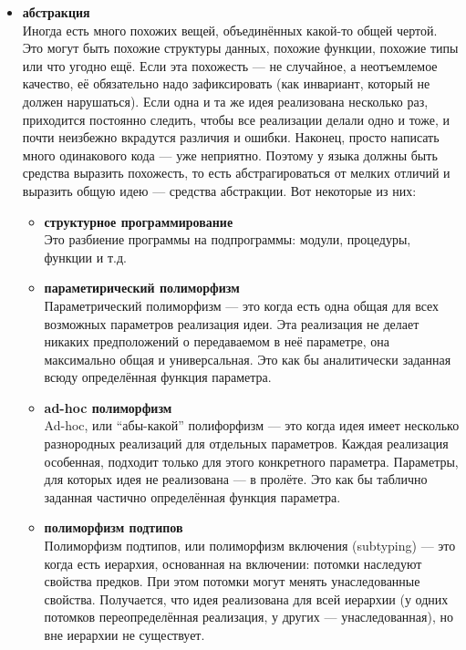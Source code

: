 \documentclass[11pt]{book}
\begin{document}
\begin{itemize}
\item \textbf{абстракция}
    \\
    Иногда есть много похожих вещей, объединённых какой-то общей чертой.
    Это могут быть похожие структуры данных, похожие функции, похожие типы или что угодно ещё.
    Если эта похожесть --- не случайное, а неотъемлемое качество, её обязательно надо зафиксировать
    (как инвариант, который не должен нарушаться).
    Если одна и та же идея реализована несколько раз, приходится постоянно следить, чтобы все реализации делали одно и тоже,
    и почти неизбежно вкрадутся различия и ошибки.
    Наконец, просто написать много одинакового кода --- уже неприятно.
    Поэтому у языка должны быть средства выразить похожесть,
    то есть абстрагироваться от мелких отличий и выразить общую идею --- средства абстракции.
    Вот некоторые из них:
    \begin{itemize}
    \item \textbf{структурное программирование}
        \\
        Это разбиение программы на подпрограммы: модули, процедуры, функции и т.д.

    \item \textbf{параметирический полиморфизм}
        \\
        Параметрический полиморфизм --- это когда есть одна общая для всех возможных параметров реализация идеи.
        Эта реализация не делает никаких предположений о передаваемом в неё параметре, она максимально общая и универсальная.
        Это как бы аналитически заданная всюду определённая функция параметра.

    \item \textbf{ad-hoc полиморфизм}
        \\
        Ad-hoc, или ``абы-какой'' полифорфизм --- это когда идея имеет несколько разнородных реализаций для отдельных параметров.
        Каждая реализация особенная, подходит только для этого конкретного параметра.
        Параметры, для которых идея не реализована --- в пролёте.
        Это как бы таблично заданная частично определённая функция параметра.

    \item \textbf{полиморфизм подтипов}
        \\
        Полиморфизм подтипов, или полиморфизм включения (subtyping) --- это когда есть иерархия, основанная на включении:
        потомки наследуют свойства предков.
        При этом потомки могут менять унаследованные свойства.
        Получается, что идея реализована для всей иерархии (у одних потомков переопределённая реализация, у других --- унаследованная),
        но вне иерархии не существует.


\end{itemize}
\end{itemize}
\end{document}
